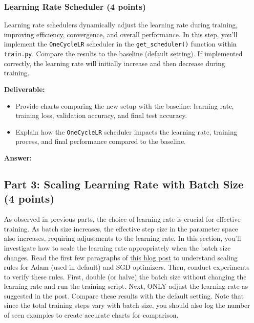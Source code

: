\documentclass[11pt, oneside]{article}   	%
\begin{document}
\subsubsection*{Learning Rate Scheduler (4 points)}

Learning rate schedulers dynamically adjust the learning rate during training, improving efficiency, convergence, and overall performance. In this step, you'll implement the \texttt{OneCycleLR} scheduler in the \texttt{get\_scheduler()} function within \texttt{train.py}. Compare the results to the baseline (default setting). If implemented correctly, the learning rate will initially increase and then decrease during training.

\noindent\textbf{Deliverable:}
\begin{itemize}
    \item Provide charts comparing the new setup with the baseline: learning rate, training loss, validation accuracy, and final test accuracy.
    \item Explain how the \texttt{OneCycleLR} scheduler impacts the learning rate, training process, and final performance compared to the baseline.
\end{itemize}

\begin{answerbox} \textbf{Answer:} \vspace*{1cm}

\end{answerbox}



\subsection*{Part 3: Scaling Learning Rate with Batch Size (4 points)}

As observed in previous parts, the choice of learning rate is crucial for effective training. As batch size increases, the effective step size in the parameter space also increases, requiring adjustments to the learning rate. In this section, you'll investigate how to scale the learning rate appropriately when the batch size changes. Read the first few paragraphs of \href{https://www.cs.princeton.edu/~smalladi/blog/2024/01/22/SDEs-ScalingRules/}{this blog post} to understand scaling rules for Adam (used in default) and SGD optimizers. Then, conduct experiments to verify these rules. First, double (or halve) the batch size without changing the learning rate and run the training script. Next, ONLY adjust the learning rate as suggested in the post. Compare these results with the default setting. Note that since the total training steps vary with batch size, you should also log the number of seen examples to create accurate charts for comparison.
\end{document}
